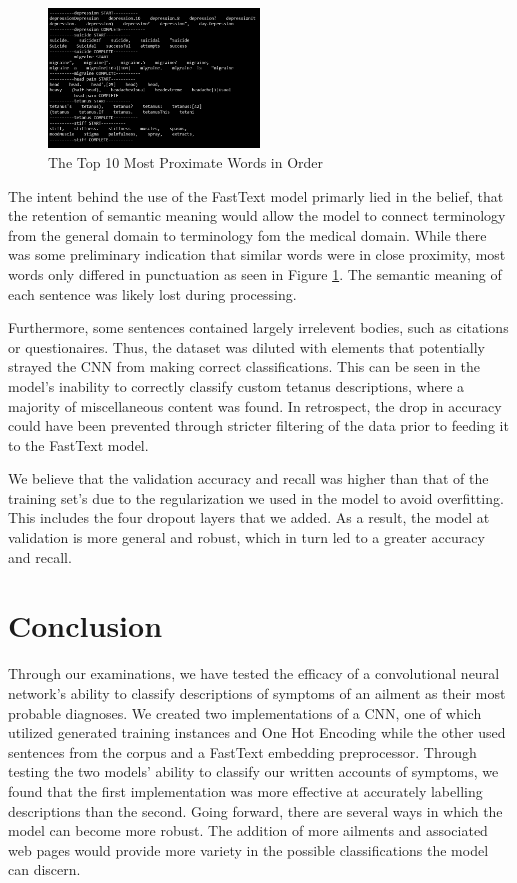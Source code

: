 \documentclass[12pt]{report}
\begin{document}
\begin{figure}[H]
	\centering
	\includegraphics[width=0.5\textwidth]{proximate-words.png}
	\caption{The Top 10 Most Proximate Words in Order}
	\label{fig:prox-words}
\end{figure}

The intent behind the use of the FastText model primarly lied in
the belief, that the retention of semantic meaning would allow the
model to connect terminology from the general domain to
terminology fom the medical domain\cite{rehurek2011gensim}. While there was some preliminary
indication that similar words were in close proximity, most words
only differed in punctuation as seen in Figure \ref{fig:prox-words}.
The semantic meaning of each sentence was likely lost during processing.

Furthermore, some sentences contained largely irrelevent bodies, such as
citations or questionaires. Thus, the dataset was diluted with elements that
potentially strayed the CNN from making correct classifications. This can be
seen in the model's inability to correctly classify custom tetanus descriptions,
where a majority of miscellaneous content was found. In retrospect, the drop
in accuracy could have been prevented through stricter filtering of the data
prior to feeding it to the FastText model.

We believe that the validation accuracy and recall was higher than that of the training set's
due to the regularization we used in the model to avoid overfitting.
This includes the four dropout layers that we added. As a result, the model
at validation is more general and robust, which in turn led to a greater
accuracy and recall.

\chapter{Conclusion}

Through our examinations, we have tested the efficacy of a convolutional neural
network's ability to classify descriptions of symptoms of an ailment as their
most probable diagnoses. We created two implementations of a CNN,
one of which utilized generated training instances and One Hot Encoding while
the other used sentences from the corpus and a FastText embedding preprocessor\cite{rehurek2011gensim}.
Through testing
the two models' ability to classify our written accounts of symptoms, we found
that the first implementation was more effective at accurately labelling
descriptions than the second. Going forward, there are several ways in which the
model can become more robust. The addition of more ailments and associated web
pages would provide more variety in the possible classifications the model can
discern.


\end{document}
